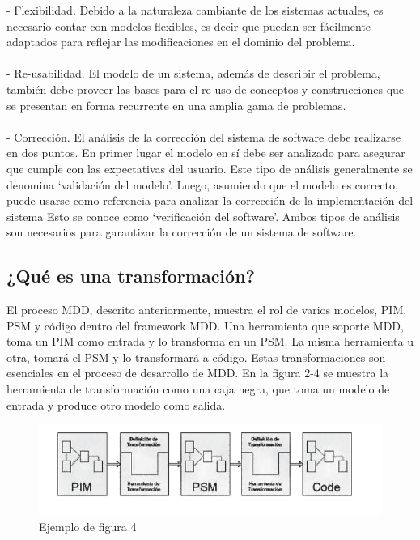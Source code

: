 - Flexibilidad. Debido a la naturaleza cambiante de los sistemas actuales, es necesario contar con modelos flexibles, es decir que puedan ser fácilmente adaptados para reflejar las modificaciones en el dominio del problema.\\\\
- Re-usabilidad. El modelo de un sistema, además de describir el problema, también debe proveer las bases para el re-uso de conceptos y construcciones que se presentan en forma recurrente en una amplia gama de problemas. \\\\
- Corrección. El análisis de la corrección del sistema de software debe realizarse en dos puntos. En primer lugar el modelo en sí debe ser analizado para asegurar que cumple con las expectativas del usuario. Este tipo de análisis generalmente se denomina ‘validación del modelo’. Luego, asumiendo que el modelo es correcto, puede usarse como referencia para analizar la corrección de la implementación del sistema Esto se conoce como ‘verificación del software’. Ambos tipos de análisis son necesarios para garantizar la corrección de un sistema de software.

\subsection{¿Qué es una transformación?}
 El proceso MDD, descrito anteriormente, muestra el rol de varios modelos, PIM, PSM y código dentro del framework MDD. Una herramienta que soporte MDD, toma un PIM como entrada y lo transforma en un PSM. La misma herramienta u otra, tomará el PSM y lo transformará a código. Estas transformaciones son esenciales en el proceso de desarrollo de MDD. En la figura 2-4 se muestra la herramienta de transformación como una caja negra, que toma un modelo de entrada y produce otro modelo como salida.
 
\begin{figure}[H]
\centering
\includegraphics[scale=0.9]{./Imagenes/modelo4}
\caption{Ejemplo de figura 4}
\label{figura4}
\end{figure}


